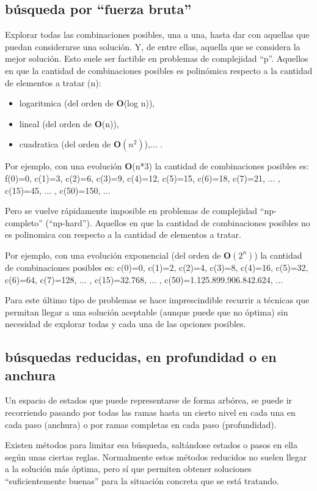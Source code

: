 \documentclass[spanish,12pt,a4paper,final,oneside]{book}
\begin{document}
\subsection{búsqueda por ``fuerza bruta''}
Explorar todas las combinaciones posibles, una a una, hasta dar con aquellas que puedan considerarse una solución. Y, de entre ellas, aquella que se considera la mejor solución.
Esto suele ser factible en problemas de complejidad ``p''. Aquellos en que la cantidad de combinaciones posibles es polinómica respecto a la cantidad de elementos a tratar (n):
\begin{itemize}
\item logaritmica (del orden de \textbf{O}(log n)), 
\item lineal (del orden de \textbf{O}(n)), 
\item cuadratica (del orden de $\textbf{O}(n^2)$),... . 
\end{itemize}

Por ejemplo, con una evolución \textbf{O}(n*3) la cantidad de combinaciones posibles es: f(0)=0, c(1)=3, c(2)=6, c(3)=9, c(4)=12, c(5)=15, c(6)=18, c(7)=21, ... , c(15)=45, ... , c(50)=150, ...

Pero se vuelve rápidamente imposible en problemas de complejidad ``np-completo'' (``np-hard''). Aquellos en que la cantidad de combinaciones posibles no es polinomica con respecto a la cantidad de elementos a tratar. 

Por ejemplo, con una evolución exponencial (del orden de $\textbf{O}(2^n)$) la cantidad de combinaciones posibles es: c(0)=0, c(1)=2, c(2)=4, c(3)=8, c(4)=16, c(5)=32, c(6)=64, c(7)=128, ... , c(15)=32.768, ... , c(50)=1.125.899.906.842.624, ...

Para este último tipo de problemas se hace imprescindible recurrir a técnicas que permitan llegar a una solución aceptable (aunque puede que no óptima) sin necesidad de explorar todas y cada una de las opciones posibles.

\subsection{búsquedas reducidas, en profundidad o en anchura}
Un espacio de estados que puede representarse de forma arbórea, se puede ir recorriendo pasando por todas las ramas hasta un cierto nivel en cada una en cada paso (anchura) o por ramas completas en cada paso (profundidad).

Existen métodos para limitar esa búsqueda, saltándose estados o pasos en ella según unas ciertas reglas. Normalmente estos métodos reducidos no suelen llegar a la solución más óptima, pero sí que permiten obtener soluciones ``suficientemente buenas'' para la situación concreta que se está tratando.
\end{document}
